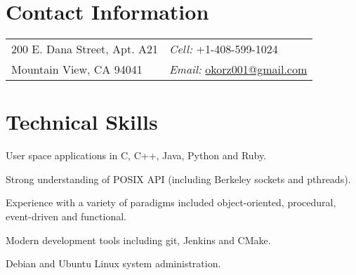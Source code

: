 
\section{Contact Information}
%
%
%
\newlength{\rcollength}\setlength{\rcollength}{2.25in}%
%
\begin{tabular}[t]{@{}p{\textwidth-\rcollength}p{\rcollength}}
  200 E. Dana Street, Apt. A21 & \textit{Cell:} +1-408-599-1024\\
  Mountain View, CA 94041 & \textit{Email:}
  \href{mailto:okorz001@gmail.com}{okorz001@gmail.com}\\
\end{tabular}


\section{Technical Skills}
\begin{lonelist}
\item[]
\begin{innerlist}
\item User space applications in C, C++, Java, Python and Ruby.

\item Strong understanding of POSIX API (including Berkeley sockets and
    pthreads).

\item Experience with a variety of paradigms included object-oriented,
    procedural, event-driven and functional.

\item Modern development tools including git, Jenkins and CMake.

\item Debian and Ubuntu Linux system administration.
\end{innerlist}
\end{lonelist}


